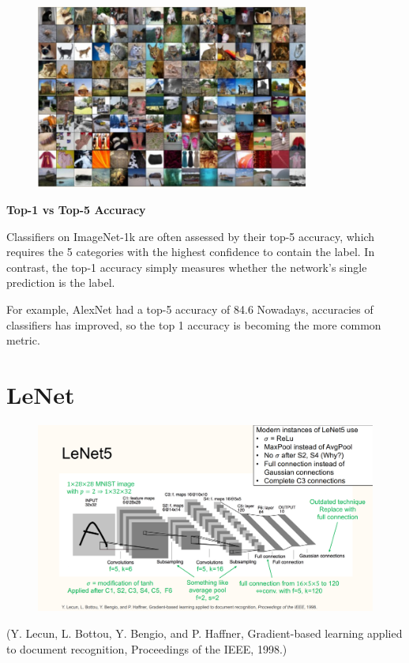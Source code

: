 \documentclass{report}
\begin{document}
\begin{definition}
    \begin{figure}[H]
        \centering
        \includegraphics[width=0.8\textwidth]{.././assets/7.2.png}
    \end{figure}

    \par\noindent\textcolor{gray}{\hdashrule{\textwidth}{0.4pt}{1pt 2pt}}

    \textbf{Top-1 vs Top-5 Accuracy}

    Classifiers on ImageNet-1k are often assessed by their top-5 accuracy, which requires the 5 categories with the highest confidence to contain the label.
    In contrast, the top-1 accuracy simply measures whether the network's single prediction is the label.

    For example, AlexNet had a top-5 accuracy of 84.6%
    Nowadays, accuracies of classifiers has improved, so the top 1 accuracy is becoming the more common metric.
\end{definition}

\section{LeNet}

\begin{definition}[7.2][LeNet5]
    \begin{figure}[H]
        \centering
        \includegraphics[width=1.0\textwidth]{.././assets/7.3.png}
    \end{figure}

    (Y. Lecun, L. Bottou, Y. Bengio, and P. Haffner, Gradient-based learning applied to document recognition, Proceedings of the IEEE, 1998.)
\end{definition}
\end{document}
